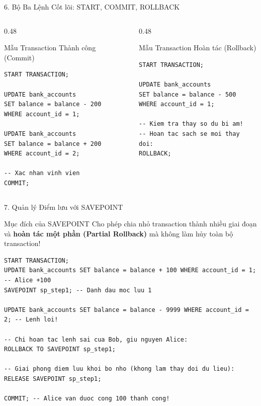 \documentclass[aspectratio=169,11pt]{beamer}
\begin{document}
\begin{frame}[fragile]{6. Bộ Ba Lệnh Cốt lõi: START, COMMIT, ROLLBACK}
  \begin{columns}[T]
    \begin{column}{0.48\textwidth}
      \begin{exampleblock}{Mẫu Transaction Thành công (Commit)}
\begin{lstlisting}
START TRANSACTION;

UPDATE bank_accounts
SET balance = balance - 200
WHERE account_id = 1;

UPDATE bank_accounts
SET balance = balance + 200
WHERE account_id = 2;

-- Xac nhan vinh vien
COMMIT;
\end{lstlisting}
      \end{exampleblock}
    \end{column}
    \begin{column}{0.48\textwidth}
      \begin{alertblock}{Mẫu Transaction Hoàn tác (Rollback)}
\begin{lstlisting}
START TRANSACTION;

UPDATE bank_accounts
SET balance = balance - 500
WHERE account_id = 1;

-- Kiem tra thay so du bi am!
-- Hoan tac sach se moi thay doi:
ROLLBACK;
\end{lstlisting}
      \end{alertblock}
    \end{column}
  \end{columns}
\end{frame}

\begin{frame}[fragile]{7. Quản lý Điểm lưu với SAVEPOINT}
  \begin{block}{Mục đích của SAVEPOINT}
    Cho phép chia nhỏ transaction thành nhiều giai đoạn và \textbf{hoàn tác một phần (Partial Rollback)} mà không làm hủy toàn bộ transaction!
  \end{block}
  \vspace{0.2em}
\begin{lstlisting}
START TRANSACTION;
UPDATE bank_accounts SET balance = balance + 100 WHERE account_id = 1; -- Alice +100
SAVEPOINT sp_step1; -- Danh dau moc luu 1

UPDATE bank_accounts SET balance = balance - 9999 WHERE account_id = 2; -- Lenh loi!

-- Chi hoan tac lenh sai cua Bob, giu nguyen Alice:
ROLLBACK TO SAVEPOINT sp_step1;

-- Giai phong diem luu khoi bo nho (khong lam thay doi du lieu):
RELEASE SAVEPOINT sp_step1;

COMMIT; -- Alice van duoc cong 100 thanh cong!
\end{lstlisting}
\end{frame}
\end{document}
